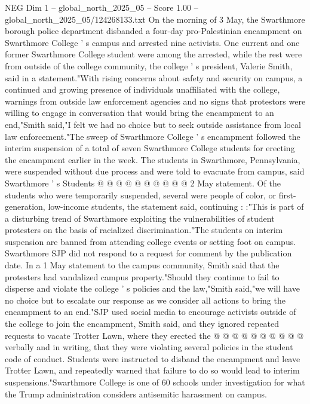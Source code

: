 \begin{textsample}{NEG Dim 1 – global\_north\_2025\_05 – Score 1.00 – global\_north\_2025\_05/124268133.txt}  \label{ex:f1_neg_237}
On the morning of 3 May, the Swarthmore borough police department disbanded a four-day pro-Palestinian encampment on Swarthmore College ' s campus and arrested nine activists.
One current and one former Swarthmore College student were among the arrested, while the rest were from outside of the college community, the college ' s president, Valerie Smith, said in a statement."With rising concerns about safety and security on campus, a continued and growing presence of individuals unaffiliated with the college, warnings from outside law enforcement agencies and no signs that protestors were willing to engage in conversation that would bring the encampment to an end,"Smith said,"I felt we had no choice but to seek outside assistance from local law enforcement."The sweep of Swarthmore College ' s encampment followed the interim suspension of a total of seven Swarthmore College students for erecting the encampment earlier in the week.
The students in Swarthmore, Pennsylvania, were suspended without due process and were told to evacuate from campus, said Swarthmore ' s Students @ @ @ @ @ @ @ @ @ @ 2 May statement.
Of the students who were temporarily suspended, several were people of color, or first-generation, low-income students, the statement said, continuing : :"This is part of a disturbing trend of Swarthmore exploiting the vulnerabilities of student protesters on the basis of racialized discrimination."The students on interim suspension are banned from attending college events or setting foot on campus.
Swarthmore SJP did not respond to a request for comment by the publication date.
In a 1 May statement to the campus community, Smith said that the protesters had vandalized campus property."Should they continue to fail to disperse and violate the college ' s policies and the law,"Smith said,"we will have no choice but to escalate our response as we consider all actions to bring the encampment to an end."SJP used social media to encourage activists outside of the college to join the encampment, Smith said, and they ignored repeated requests to vacate Trotter Lawn, where they erected the @ @ @ @ @ @ @ @ @ @ verbally and in writing, that they were violating several policies in the student code of conduct.
Students were instructed to disband the encampment and leave Trotter Lawn, and repeatedly warned that failure to do so would lead to interim suspensions."Swarthmore College is one of 60 schools under investigation for what the Trump administration considers antisemitic harassment on campus.

\end{textsample}
